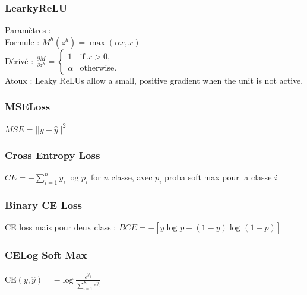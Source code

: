 \documentclass{article}
\theoremstyle{plain}%
\theoremstyle{definition}
\theoremstyle{remark}
\begin{document}
\begin{multicols}{2}
\subsubsection{LearkyReLU}
Paramètres : \\
Formule : $ M^h(z^h) = \max(\alpha x, x) $ \\
Dérivé : $ \frac{\partial M}{\partial z^h} = 
    \begin{cases} 
        1 & \text{if } x>0, \\
        \alpha & \text{otherwise}.
    \end{cases}$ \\
Atoux : Leaky ReLUs allow a small, positive gradient when the unit is not active.

\subsubsection{MSELoss}
$ MSE = ||y - \hat{y}||^2 $ 

\subsubsection{Cross Entropy Loss}
$ CE = - \sum_{i=1}^{n} y_i \log_{} p_i $ for $ n $ classe, avec $ p_i $ proba soft max pour la classe $ i $ 

\subsubsection{Binary CE Loss}
CE loss mais pour deux class : $ BCE = - [ y \log_{} p + (1 - y) \log_{} (1 - p) ] $ 

\subsubsection{CELog Soft Max}
$ \displaystyle \text{CE}(y, \hat{y}) = - \log \frac {e^{\hat{y}_y}} {\sum_{i=1}^{K}e^{\hat{y}_i}} $

\end{multicols}
\end{document}
